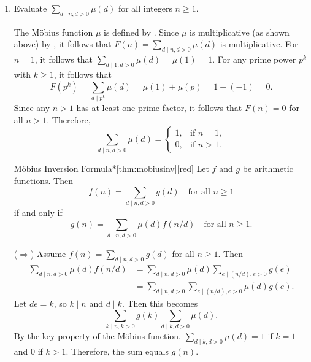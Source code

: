 \begin{enumerate}
\begin{subprove}
    A counterexample is provided to show that $\mu$ is not completely multiplicative.
    Let $m = 2$ and $n = 2$. Since $2$ is a single prime, it follows that $\mu(2) = -1$ and $\mu(2) \cdot \mu(2) = 1$.
    Since $2^2 \mid 4$, it follows that $\mu(4) = 0$.
    Therefore,
    \[
    \mu(4) = 0 \neq 1 = \mu(2)\mu(2).
    \]
    Since $\mu(4) \neq \mu(2)\mu(2)$, it is shown that $\mu$ is not completely multiplicative.
  \end{subprove}
  \item Evaluate $\sum_{d \mid n, d>0} \mu(d)$ for all integers $n \geq 1$.
  \begin{subanswer}
    The Möbius function $\mu$ is defined by . 
    Since $\mu$ is multiplicative (as shown above) by , it follows that $F(n) = \sum_{d \mid n, d>0} \mu(d)$ is multiplicative.
    For $n = 1$, it follows that $\sum_{d \mid 1, d>0} \mu(d) = \mu(1) = 1$.
    For any prime power $p^k$ with $k \geq 1$, it follows that
    \[
    F(p^k) = \sum_{d \mid p^k} \mu(d) = \mu(1) + \mu(p) = 1 + (-1) = 0.
    \]
    Since any $n > 1$ has at least one prime factor, it follows that $F(n) = 0$ for all $n > 1$.
    Therefore,
    \[
    \sum_{d \mid n, d>0} \mu(d) = \begin{cases}
    1, & \text{if } n = 1,\\
    0, & \text{if } n > 1.
    \end{cases}
    \]
  \end{subanswer}

  \newpage

  \begin{define}{Möbius Inversion Formula*}[thm:mobiusinv][red]
    Let $f$ and $g$ be arithmetic functions. Then
    \[
    f(n)=\sum_{d\mid n, d>0} g(d) \quad \text{for all } n\ge 1
    \]
    if and only if
    \[
    g(n)=\sum_{d\mid n, d>0}\mu(d)f(n/d) \quad \text{for all } n\ge 1.
    \]
    \begin{subprove}
      ($\Rightarrow$) Assume $f(n)=\sum_{d\mid n, d>0} g(d)$ for all $n\ge 1$. Then
      \begin{align*}
        \sum_{d\mid n, d>0}\mu(d)f(n/d) &= \sum_{d\mid n, d>0}\mu(d)\sum_{e\mid (n/d), e>0}g(e)\\
        &= \sum_{d\mid n, d>0}\sum_{e\mid (n/d), e>0}\mu(d)g(e).
      \end{align*}
      Let $de = k$, so $k\mid n$ and $d\mid k$. Then this becomes
      \[
      \sum_{k\mid n, k>0}g(k)\sum_{d\mid k, d>0}\mu(d).
      \]
      By the key property of the Möbius function, $\sum_{d\mid k, d>0}\mu(d) = 1$ if $k=1$ and $0$ if $k>1$. Therefore, the sum equals $g(n)$.
      

\end{subprove}
\end{define}
\end{enumerate}
